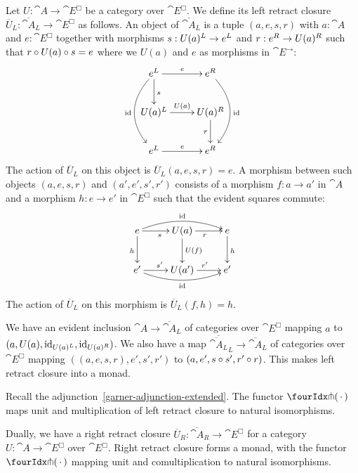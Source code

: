 \documentclass[reqno,10pt,a4paper,oneside]{amsart}
\begin{document}
Let $U : \cat{A} \to \cat{E}^{\Box}$ be a category over $\cat{E}^{\Box}$.
We define its left retract closure $\overline{U}_L : \overline{\cat{A}}_L \to \cat{E}^{\Box}$ as follows.
An object of $\overline{\cat{A}}_L$ is a tuple $(a, e, s, r)$ with $a : \cat{A}$ and $e : \cat{E}^{\Box}$ together with morphisms $s : U(a){}^L \to e{}^L$ and $r : e{}^R \to U(a){}^R$ such that $r \mathbin{\circ} U(a) \mathbin{\circ} s = e$ where we $U(a)$ and $e$ as morphisms in $\cat{E}^{\to}$:
\[
\xymatrix{
  e\sql
  \ar[r]^{e}
  \ar[d]^{s}
  \ar@/_2em/[dd]_{\id}
&
  e\sqr
  \ar@/^2em/[dd]^{\id}
\\
  U(a)\sql
  \ar[r]^{U(a)}
&
  U(a)\sqr
  \ar[d]_{r}
\\
  e\sql
  \ar[r]^{e}
&
  e\sqr
}
\]
The action of $\overline{U}_L$ on this object is $\overline{U}_L(a, e, s, r) = e$.
A morphism between such objects $(a, e, s, r)$ and $(a', e', s', r')$ consists of a morphism $f : a \to a'$ in $\cat{A}$ and a morphism $h : e \to e'$ in $\cat{E}^{\Box}$ such that the evident squares commute:
\[
\xymatrix{
  e
  \ar[r]_{s}
  \ar@/^1em/[rr]^{\id}
  \ar[d]_{h}
&
  U(a)
  \ar[r]_{r}
  \ar[d]^{U(f)}
&
  e
  \ar[d]^{h}
\\
  e'
  \ar[r]^{s'}
  \ar@/_1em/[rr]_{\id}
&
  U(a')
  \ar[r]^{r'}
&
  e'
}
\]
The action of $\overline{U}_L$ on this morphism is $\overline{U}_L(f, h) = h$.

We have an evident inclusion $\cat{A} \to \overline{\cat{A}}_L$ of categories over $\cat{E}^{\Box}$ mapping $a$ to $(a, U(a), \operatorname{id}_{U(a){}^L}, \operatorname{id}_{U(a){}^R})$.
We also have a map $\overline{\overline{\cat{A}}_L}_L \to \overline{\cat{A}}_L$ of categories over $\cat{E}^{\Box}$ mapping $((a, e, s, r), e', s', r')$ to $(a, e', s \mathbin{\circ} s', r' \mathbin{\circ} r)$.
This makes left retract closure into a monad.

\begin{lemma}
\label{retract-closure-extended-left}
Recall the adjunction~\eqref{garner-adjunction-extended}.
The functor $\liftr{\brarghole}$ maps unit and multiplication of left retract closure to natural isomorphisms.
\end{lemma}

\begin{remark}
\label{retract-closure-extended-right}
Dually, we have a right retract closure $\overline{U}_R : \overline{\cat{A}}_R \to \cat{E}^{\Box}$ for a category $U : \cat{A} \to \cat{E}^{\Box}$ over $\cat{E}^{\Box}$.
Right retract closure forms a monad, with the functor $\liftl{\brarghole}$ mapping unit and comultiplication to natural isomorphisms.
\end{remark}
\end{document}
